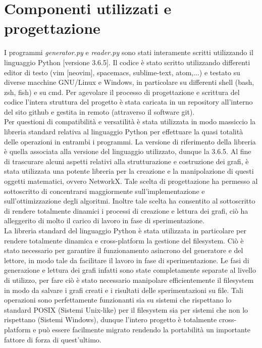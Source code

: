 \section{Componenti utilizzati e progettazione}
\justify
I programmi \textit{generator.py} e \textit{reader.py} sono stati interamente scritti utilizzando il linguaggio Python [versione 3.6.5]. Il codice è stato scritto utilizzando differenti editor di testo (vim [neovim], spacemacs, sublime-text, atom,...) e testato su diverse macchine GNU/Linux e Windows, in particolare su differenti shell (bash, zsh, fish) e su cmd. Per agevolare il processo di progettazione e scrittura del codice l'intera struttura del progetto è stata caricata in un repository all'interno del sito github e gestita in remoto (attraverso il software git).\\
Per questioni di compatibilità e versatilità è stata utilizzata in modo massiccio la libreria standard relativa al linguaggio Python per effettuare la quasi totalità delle operazioni in entrambi i programmi. La versione di riferimento della libreria è quella associata alla versione del linguaggio utilizzato, dunque la 3.6.5. Al fine di trascurare alcuni aspetti relativi alla strutturazione e costruzione dei grafi, è stata utilizzata una potente libreria per la creazione e la manipolazione di questi oggetti matematici, ovvero NetworkX. Tale scelta di progettazione ha permesso al sottoscritto di concentrarsi maggiormente sull'implementazione e sull'ottimizzazione degli algoritmi. Inoltre tale scelta ha consentito al sottoscritto di rendere totalmente dinamici i processi di creazione e lettura dei grafi, ciò ha alleggerito di molto il carico di lavoro in fase di sperimentazione.\\
La libreria standard del linguaggio Python è stata utilizzata in particolare per rendere totalmente dinamica e cross-platform la gestione del filesystem. Ciò è stato necessario per garantire il funzionamento asincrono del generatore e del lettore, in modo tale da facilitare il lavoro in fase di sperimentazione. Le fasi di generazione e lettura dei grafi infatti sono state completamente separate al livello di utilizzo, per fare ciò è stato necessario manipolare efficientemente il filesystem in modo da salvare i grafi creati e i risultati delle sperimentazioni su file. Tali operazioni sono perfettamente funzionanti sia su sistemi che rispettano lo standard POSIX (Sistemi Unix-like) per il filesystem sia per sistemi che non lo rispettano (Sistemi Windows), dunque l'intero progetto è totalmente cross-platform e può essere facilmente migrato rendendo la portabilità un importante fattore di forza di quest'ultimo.\\
